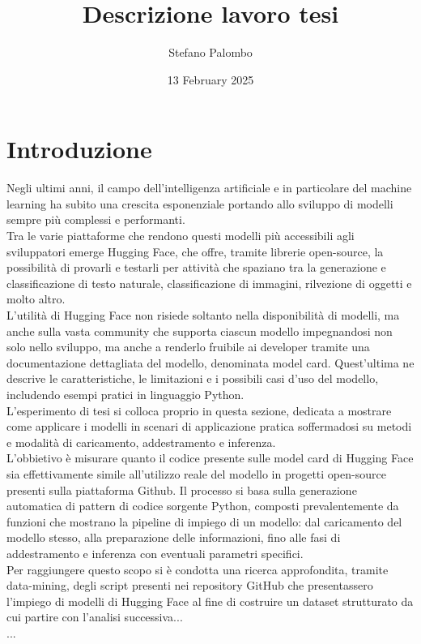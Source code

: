 \documentclass{article}
\title{Descrizione lavoro tesi}
\author{Stefano Palombo}
\date{13 February 2025}
\begin{document}
\maketitle

\section{Introduzione}
Negli ultimi anni, il campo dell'intelligenza artificiale e in particolare del machine learning ha subito una crescita esponenziale portando allo sviluppo di modelli sempre più complessi e performanti.\\
Tra le varie piattaforme che rendono questi modelli più accessibili agli sviluppatori emerge Hugging Face, che offre, tramite librerie open-source, la possibilità di provarli e testarli per attività che spaziano tra la generazione e classificazione di testo naturale, classificazione di immagini, rilvezione di oggetti e molto altro.\\
L'utilità di Hugging Face non risiede soltanto nella disponibilità di modelli, ma anche sulla vasta community che supporta ciascun modello impegnandosi non solo nello sviluppo, ma anche a renderlo fruibile ai developer tramite una documentazione dettagliata del modello, denominata model card. Quest'ultima ne descrive le caratteristiche, le limitazioni e i possibili casi d'uso del modello, includendo esempi pratici in linguaggio Python.\\
L'esperimento di tesi si colloca proprio in questa sezione, dedicata a mostrare come applicare i modelli in scenari di applicazione pratica soffermadosi su metodi e modalità di caricamento, addestramento e inferenza.\\
L'obbietivo è misurare quanto il codice presente sulle model card di Hugging Face sia effettivamente simile all'utilizzo reale del modello in progetti open-source presenti sulla piattaforma Github. Il processo si basa sulla generazione automatica di pattern di codice sorgente Python, composti prevalentemente da funzioni che mostrano la pipeline di impiego di un modello: dal caricamento del modello stesso, alla preparazione delle informazioni, fino alle fasi di addestramento e inferenza con eventuali parametri specifici.\\
Per raggiungere questo scopo si è condotta una ricerca approfondita, tramite data-mining, degli script presenti nei repository GitHub che presentassero l'impiego di modelli di Hugging Face al fine di costruire un dataset strutturato da cui partire con l'analisi successiva...\\
...\\
\end{document}
